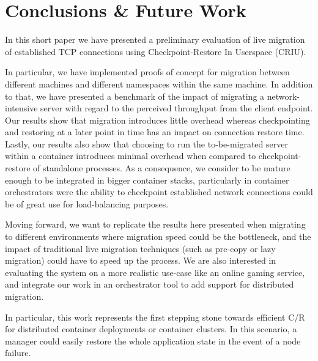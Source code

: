 \section{Conclusions \& Future Work} \label{sec:conclusion}

In this short paper we have presented a preliminary evaluation of live migration of established TCP connections using Checkpoint-Restore In Userspace (CRIU).

In particular, we have implemented proofs of concept for migration between different machines and different namespaces within the same machine.
In addition to that, we have presented a benchmark of the impact of migrating a network-intensive server with regard to the perceived throughput from the client endpoint.
Our results show that migration introduces little overhead whereas checkpointing and restoring at a later point in time has an impact on connection restore time.
Lastly, our results also show that choosing to run the to-be-migrated server within a \runc container introduces minimal overhead when compared to checkpoint-restore of standalone processes.
As a consequence, we consider \criu to be mature enough to be integrated in bigger container stacks, particularly in container orchestrators were the ability to checkpoint established network connections could be of great use for load-balancing purposes.

Moving forward, we want to replicate the results here presented when migrating to different environments where migration speed could be the bottleneck, and the impact of traditional live migration techniques (such as pre-copy or lazy migration) could have to speed up the process.
We are also interested in evaluating the system on a more realistic use-case like an online gaming service, and integrate our work in an orchestrator tool to add support for distributed migration.

In particular, this work represents the first stepping stone towards efficient C/R for distributed container deployments or container clusters.
In this scenario, a manager could easily restore the whole application state in the event of a node failure.
